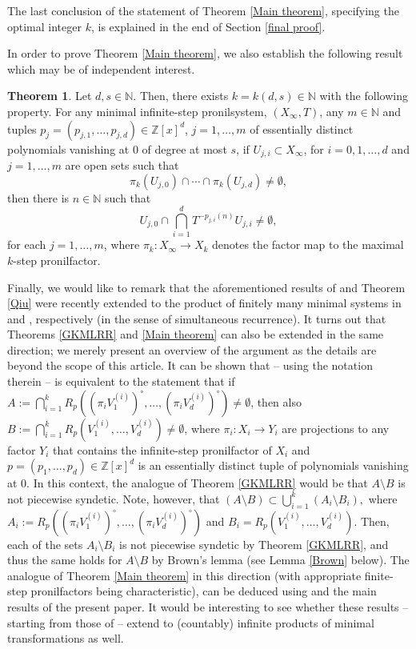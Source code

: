 \documentclass[reqno]{amsart}
\def\Z{{\mathbb Z}}
\def\N{{\mathbb N}}
\theoremstyle{definition}
\newtheorem{thmx}{Theorem}
\theoremstyle{remark}
\def\N{{\mathbb N}}
\begin{document}
The last conclusion of the statement of Theorem \ref{Main theorem}, specifying the optimal 
integer $k$, is explained in the end of Section \ref{final proof}.

In order to prove Theorem \ref{Main theorem}, we also 
establish the 
following result which may be of independent interest. 

\begin{thmx}\label{k factor is characteristic intro}
Let $d,s\in \N$. Then, there exists $k=k(d,s)\in \N$ with the following 
property. For any minimal infinite-step pronilsystem, 
$(X_{\infty},T)$, any $m\in \N$ and tuples 
$p_j=(p_{j,1},\ldots,p_{j,d})\in \Z[x]^{d}$, $j=1,\ldots,m$ 
of 
essentially distinct 
polynomials vanishing at $0$ of degree at most $s$, if $U_{j,i}\subset X_{\infty}$, for $i=0,1,\ldots,d$ and 
$j=1,\ldots,m$ are open sets such that 
$$\pi_k(U_{j,0}) \cap \cdots \cap \pi_k(U_{j,d}) \neq \emptyset, $$
then there is $n\in \N$ such that 
\begin{equation}\label{same return time}
U_{j,0} \cap \bigcap_{i=1}^d T^{-p_{j,i}(n)}U_{j,i} \neq \emptyset,    
\end{equation}
for each $j=1,\ldots,m$, where $\pi_k:X_{\infty}\to X_k$ denotes the factor map to the maximal $k$-step pronilfactor.
\end{thmx}

Finally, we would like to remark that the aforementioned 
results of \cite{Huang_Shao_Ye} and Theorem \ref{Qiu} were 
recently extended to the product of finitely many minimal 
systems in \cite{QiuXuYeYu} and \cite{WuYu}, respectively (in 
the sense of simultaneous recurrence).
It turns out that Theorems \ref{GKMLRR} and \ref{Main theorem} can also be extended in the same direction; we merely present an overview of the argument as the details are beyond the scope of this article. It can be shown that \cite[Theorem 1.1]{WuYu} -- using the notation therein -- is equivalent to the statement that if $A:=\bigcap_{i=1}^k R_p ((\pi_i V_1^{(i)})^{\circ} , \ldots , (\pi_i V_d^{(i)})^{\circ} ) \neq \emptyset $, then also 
$B:= \bigcap_{i=1}^k R_p (V_1^{(i)} , \ldots , V_d^{(i)}) \neq \emptyset $, 
where $\pi_i: X_i \to Y_i$ are projections to any factor $Y_i$ that contains the infinite-step pronilfactor of $X_i$ and $p=(p_1,\ldots,p_d)\in \Z[x]^d$ is an essentially distinct tuple of polynomials vanishing at $0$. In this context, the analogue of Theorem \ref{GKMLRR} would be that $A\setminus B$ is not piecewise syndetic. Note, however, that  
$(A\setminus B) \subset \bigcup_{i=1}^k (A_i\setminus B_i),$
where $A_i:=R_p ((\pi_i V_1^{(i)})^{\circ} , \ldots , (\pi_i V_d^{(i)})^{\circ} )$ and 
$B_i=R_p (V_1^{(i)} , \ldots , V_d^{(i)})$. 
Then, each of the sets $A_i\setminus B_i$ is not piecewise syndetic by Theorem \ref{GKMLRR}, and thus the same holds for $A \setminus B$ by Brown's lemma (see Lemma \ref{Brown} below). 
The analogue of Theorem \ref{Main theorem} in this direction (with appropriate finite-step pronilfactors being characteristic), can be deduced using \cite[Theorem 3.4]{WuYu} and the main results of the present paper. It would be interesting to see whether these results -- starting from those of \cite{QiuXuYeYu, Ye_Yu} -- extend to (countably) infinite products of minimal transformations as well. 
\end{document}

